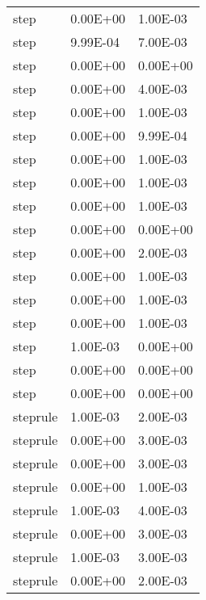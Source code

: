 \begin{appendices}
\begin{center}
\begin{longtable}{|l|l|l|}
step                          & 0.00E+00      & 1.00E-03        \\
step                          & 9.99E-04      & 7.00E-03        \\
step                          & 0.00E+00      & 0.00E+00        \\
step                          & 0.00E+00      & 4.00E-03        \\
step                          & 0.00E+00      & 1.00E-03        \\
step                          & 0.00E+00      & 9.99E-04        \\
step                          & 0.00E+00      & 1.00E-03        \\
step                          & 0.00E+00      & 1.00E-03        \\
step                          & 0.00E+00      & 1.00E-03        \\
step                          & 0.00E+00      & 0.00E+00        \\
step                          & 0.00E+00      & 2.00E-03        \\
step                          & 0.00E+00      & 1.00E-03        \\
step                          & 0.00E+00      & 1.00E-03        \\
step                          & 0.00E+00      & 1.00E-03        \\
step                          & 1.00E-03      & 0.00E+00        \\
step                          & 0.00E+00      & 0.00E+00        \\
step                          & 0.00E+00      & 0.00E+00        \\
steprule                      & 1.00E-03      & 2.00E-03        \\
steprule                      & 0.00E+00      & 3.00E-03        \\
steprule                      & 0.00E+00      & 3.00E-03        \\
steprule                      & 0.00E+00      & 1.00E-03        \\
steprule                      & 1.00E-03      & 4.00E-03        \\
steprule                      & 0.00E+00      & 3.00E-03        \\
steprule                      & 1.00E-03      & 3.00E-03        \\
steprule                      & 0.00E+00      & 2.00E-03        \\

\end{longtable}
\end{center}
\end{appendices}
